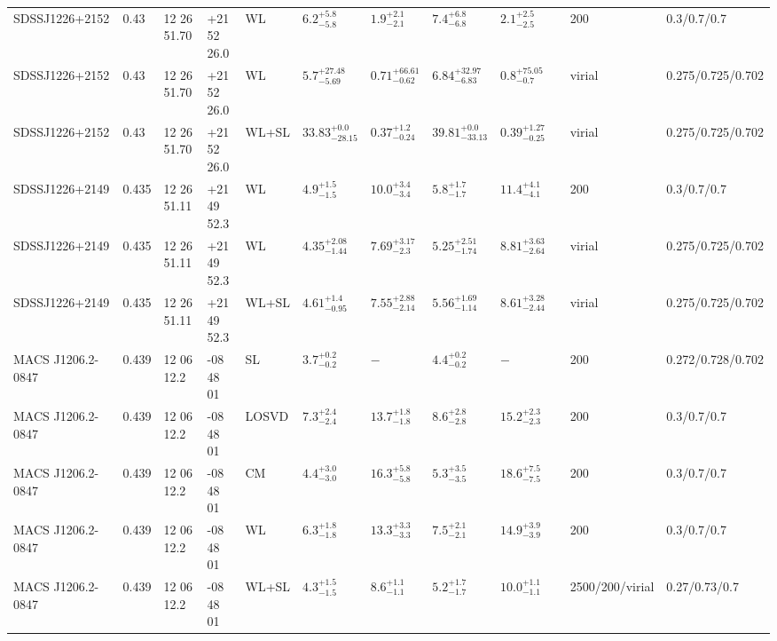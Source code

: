 \begin{landscape}
\begin{center}
{\begin{longtable}{llllllllllll}
SDSSJ1226+2152 & 0.43 & 12 26 51.70 & +21 52 26.0 & WL & ${6.2}^{+5.8}_{-5.8}$ & ${1.9}^{+2.1}_{-2.1}$ & ${7.4}^{+6.8}_{-6.8}$ & ${2.1}^{+2.5}_{-2.5}$ & \citet{SE14.1} & 200 & 0.3/0.7/0.7 \\
SDSSJ1226+2152 & 0.43 & 12 26 51.70 & +21 52 26.0 & WL & ${5.7}^{+27.48}_{-5.69}$ & ${0.71}^{+66.61}_{-0.62}$ & ${6.84}^{+32.97}_{-6.83}$ & ${0.8}^{+75.05}_{-0.7}$ & \citet{OG12.1} & virial & 0.275/0.725/0.702 \\
SDSSJ1226+2152 & 0.43 & 12 26 51.70 & +21 52 26.0 & WL+SL & ${33.83}^{+0.0}_{-28.15}$ & ${0.37}^{+1.2}_{-0.24}$ & ${39.81}^{+0.0}_{-33.13}$ & ${0.39}^{+1.27}_{-0.25}$ & \citet{OG12.1} & virial & 0.275/0.725/0.702 \\
SDSSJ1226+2149 & 0.435 & 12 26 51.11 & +21 49 52.3 & WL & ${4.9}^{+1.5}_{-1.5}$ & ${10.0}^{+3.4}_{-3.4}$ & ${5.8}^{+1.7}_{-1.7}$ & ${11.4}^{+4.1}_{-4.1}$ & \citet{SE14.1} & 200 & 0.3/0.7/0.7 \\
SDSSJ1226+2149 & 0.435 & 12 26 51.11 & +21 49 52.3 & WL & ${4.35}^{+2.08}_{-1.44}$ & ${7.69}^{+3.17}_{-2.3}$ & ${5.25}^{+2.51}_{-1.74}$ & ${8.81}^{+3.63}_{-2.64}$ & \citet{OG12.1} & virial & 0.275/0.725/0.702 \\
SDSSJ1226+2149 & 0.435 & 12 26 51.11 & +21 49 52.3 & WL+SL & ${4.61}^{+1.4}_{-0.95}$ & ${7.55}^{+2.88}_{-2.14}$ & ${5.56}^{+1.69}_{-1.14}$ & ${8.61}^{+3.28}_{-2.44}$ & \citet{OG12.1} & virial & 0.275/0.725/0.702 \\
MACS J1206.2-0847 & 0.439 & 12 06 12.2 & -08 48 01 & SL & ${3.7}^{+0.2}_{-0.2}$ & ${-}^{}_{}$ & ${4.4}^{+0.2}_{-0.2}$ & ${-}^{}_{}$ & \citet{EI13.1} & 200 & 0.272/0.728/0.702 \\
MACS J1206.2-0847 & 0.439 & 12 06 12.2 & -08 48 01 & LOSVD & ${7.3}^{+2.4}_{-2.4}$ & ${13.7}^{+1.8}_{-1.8}$ & ${8.6}^{+2.8}_{-2.8}$ & ${15.2}^{+2.3}_{-2.3}$ & \citet{BI13.1} & 200 & 0.3/0.7/0.7 \\
MACS J1206.2-0847 & 0.439 & 12 06 12.2 & -08 48 01 & CM & ${4.4}^{+3.0}_{-3.0}$ & ${16.3}^{+5.8}_{-5.8}$ & ${5.3}^{+3.5}_{-3.5}$ & ${18.6}^{+7.5}_{-7.5}$ & \citet{BI13.1} & 200 & 0.3/0.7/0.7 \\
MACS J1206.2-0847 & 0.439 & 12 06 12.2 & -08 48 01 & WL & ${6.3}^{+1.8}_{-1.8}$ & ${13.3}^{+3.3}_{-3.3}$ & ${7.5}^{+2.1}_{-2.1}$ & ${14.9}^{+3.9}_{-3.9}$ & \citet{SE14.1} & 200 & 0.3/0.7/0.7 \\
MACS J1206.2-0847 & 0.439 & 12 06 12.2 & -08 48 01 & WL+SL & ${4.3}^{+1.5}_{-1.5}$ & ${8.6}^{+1.1}_{-1.1}$ & ${5.2}^{+1.7}_{-1.7}$ & ${10.0}^{+1.1}_{-1.1}$ & \citet{ME14.1} & 2500/200/virial & 0.27/0.73/0.7 \\

\end{longtable}}
\end{center}
\end{landscape}

